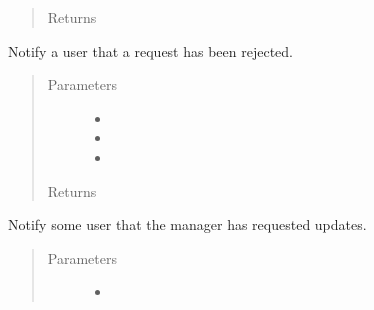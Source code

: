 \documentclass[letterpaper,10pt,english]{sphinxmanual}
\begin{document}
\begin{fulllineitems}
\begin{fulllineitems}
\begin{quote}
\begin{description}
\item[{Returns}] \leavevmode


\end{description}\end{quote}

\end{fulllineitems}


\begin{fulllineitems}
\label{\detokenize{apidoc/utdesign_procurement:utdesign_procurement.emailer.EmailHandler.notifyStudentRejected}}
Notify a user that a request has been rejected.
\begin{quote}\begin{description}
\item[{Parameters}] \leavevmode\begin{itemize}
\item {} 
 \textendash{} 

\item {} 
 \textendash{} 

\item {} 
 \textendash{} 

\end{itemize}

\item[{Returns}] \leavevmode


\end{description}\end{quote}

\end{fulllineitems}


\begin{fulllineitems}
\label{\detokenize{apidoc/utdesign_procurement:utdesign_procurement.emailer.EmailHandler.notifyUpdateManager}}
Notify some user that the manager has requested updates.
\begin{quote}\begin{description}
\item[{Parameters}] \leavevmode\begin{itemize}
\item {} 
 \textendash{} 


\end{itemize}
\end{description}
\end{quote}
\end{fulllineitems}
\end{fulllineitems}
\end{document}
